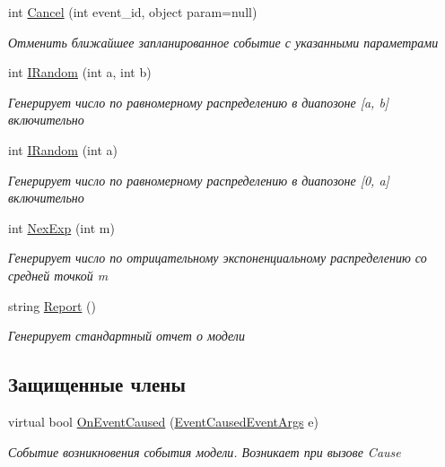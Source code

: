 \begin{DoxyCompactItemize}
int \hyperlink{class_s_m_p_l_sharp_1_1_smpl_model_a2af716a4608f04a0ec2814d921c5197e}{Cancel} (int event\-\_\-id, object param=null)
\begin{DoxyCompactList}\small\item\em Отменить ближайшее запланированное событие с указанными параметрами \end{DoxyCompactList}\item 
int \hyperlink{class_s_m_p_l_sharp_1_1_smpl_model_a77390fc51749077e44b0285a76faf5cc}{I\-Random} (int a, int b)
\begin{DoxyCompactList}\small\item\em Генерирует число по равномерному распределению в диапозоне \mbox{[}a, b\mbox{]} включительно \end{DoxyCompactList}\item 
int \hyperlink{class_s_m_p_l_sharp_1_1_smpl_model_aa89b976daa026bf83a1a2818d34abfa0}{I\-Random} (int a)
\begin{DoxyCompactList}\small\item\em Генерирует число по равномерному распределению в диапозоне \mbox{[}0, a\mbox{]} включительно \end{DoxyCompactList}\item 
int \hyperlink{class_s_m_p_l_sharp_1_1_smpl_model_a2a899ce5ab2a8a7b127a962c33b047e4}{Nex\-Exp} (int m)
\begin{DoxyCompactList}\small\item\em Генерирует число по отрицательному экспоненциальному распределению со средней точкой m \end{DoxyCompactList}\item 
string \hyperlink{class_s_m_p_l_sharp_1_1_smpl_model_a221aa0af22ddc3dcc9860df9a76eb96e}{Report} ()
\begin{DoxyCompactList}\small\item\em Генерирует стандартный отчет о модели \end{DoxyCompactList}\end{DoxyCompactItemize}
\subsection*{Защищенные члены}
\begin{DoxyCompactItemize}
\item 
virtual bool \hyperlink{class_s_m_p_l_sharp_1_1_smpl_model_a855ce8850f451bb372a12c9a02c2b422}{On\-Event\-Caused} (\hyperlink{class_s_m_p_l_sharp_1_1_event_caused_event_args}{Event\-Caused\-Event\-Args} e)
\begin{DoxyCompactList}\small\item\em Событие возникновения события модели. Возникает при вызове Cause \end{DoxyCompactList}\end{DoxyCompactItemize}
